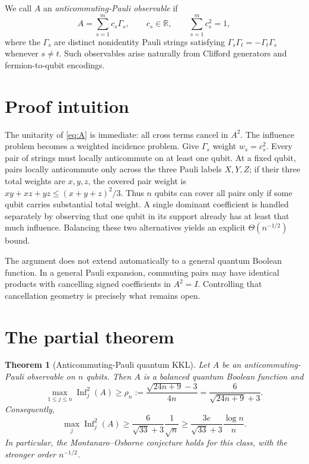 \documentclass[11pt]{article}
\newtheorem{theorem}{Theorem}
\newcommand{\Inf}{\operatorname{Inf}}
\begin{document}
We call $A$ an \emph{anticommuting-Pauli observable} if
\begin{equation}\label{eq:A}
 A=\sum_{s=1}^m c_s\Gamma_s,
 \qquad c_s\in\mathbb R,
 \qquad \sum_{s=1}^m c_s^2=1,
\end{equation}
where the $\Gamma_s$ are distinct nonidentity Pauli strings satisfying
$\Gamma_s\Gamma_t=-\Gamma_t\Gamma_s$ whenever $s\ne t$.
Such observables arise naturally from Clifford generators and
fermion-to-qubit encodings.

\section{Proof intuition}

The unitarity of \eqref{eq:A} is immediate: all cross terms cancel in
$A^2$. The influence problem becomes a weighted incidence problem. Give
$\Gamma_s$ weight $w_s=c_s^2$. Every pair of strings must locally
anticommute on at least one qubit. At a fixed qubit, pairs locally
anticommute only across the three Pauli labels $X,Y,Z$; if their three total
weights are $x,y,z$, the covered pair weight is
$xy+xz+yz\le(x+y+z)^2/3$. Thus $n$ qubits can cover all pairs only if some
qubit carries substantial total weight. A single dominant coefficient is
handled separately by observing that one qubit in its support already has at
least that much influence. Balancing these two alternatives yields an
explicit $\Theta(n^{-1/2})$ bound.

The argument does not extend automatically to a general quantum Boolean
function. In a general Pauli expansion, commuting pairs may have identical
products with cancelling signed coefficients in $A^2=I$. Controlling that
cancellation geometry is precisely what remains open.

\section{The partial theorem}

\begin{theorem}[Anticommuting-Pauli quantum KKL]\label{thm:main}
Let $A$ be an anticommuting-Pauli observable on $n$ qubits. Then $A$ is a
balanced quantum Boolean function and
\begin{equation}\label{eq:rho}
 \max_{1\le j\le n}\Inf_j^2(A)
 \ge \rho_n
 :=\frac{\sqrt{24n+9}-3}{4n}
 =\frac{6}{\sqrt{24n+9}+3}.
\end{equation}
Consequently,
\begin{equation}\label{eq:root}
 \max_j\Inf_j^2(A)
 \ge \frac{6}{\sqrt{33}+3}\frac1{\sqrt n}
 \ge \frac{3e}{\sqrt{33}+3}\frac{\log n}{n}.
\end{equation}
In particular, the Montanaro--Osborne conjecture holds for this class, with
the stronger order $n^{-1/2}$.
\end{theorem}
\end{document}

